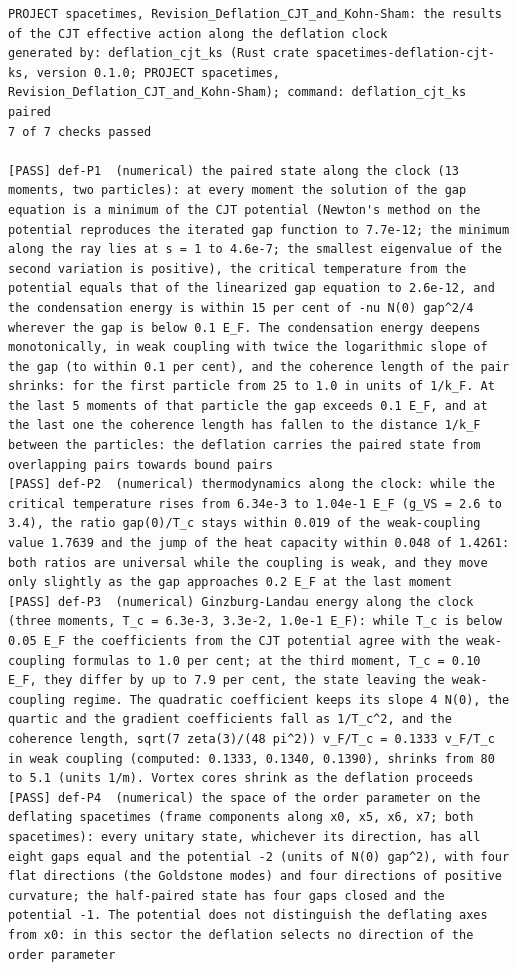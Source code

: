 \documentclass[
  10pt,
]{article}
\begin{document}
\begin{verbatim}
PROJECT spacetimes, Revision_Deflation_CJT_and_Kohn-Sham: the results of the CJT effective action along the deflation clock
generated by: deflation_cjt_ks (Rust crate spacetimes-deflation-cjt-ks, version 0.1.0; PROJECT spacetimes, Revision_Deflation_CJT_and_Kohn-Sham); command: deflation_cjt_ks paired
7 of 7 checks passed

[PASS] def-P1  (numerical) the paired state along the clock (13 moments, two particles): at every moment the solution of the gap equation is a minimum of the CJT potential (Newton's method on the potential reproduces the iterated gap function to 7.7e-12; the minimum along the ray lies at s = 1 to 4.6e-7; the smallest eigenvalue of the second variation is positive), the critical temperature from the potential equals that of the linearized gap equation to 2.6e-12, and the condensation energy is within 15 per cent of -nu N(0) gap^2/4 wherever the gap is below 0.1 E_F. The condensation energy deepens monotonically, in weak coupling with twice the logarithmic slope of the gap (to within 0.1 per cent), and the coherence length of the pair shrinks: for the first particle from 25 to 1.0 in units of 1/k_F. At the last 5 moments of that particle the gap exceeds 0.1 E_F, and at the last one the coherence length has fallen to the distance 1/k_F between the particles: the deflation carries the paired state from overlapping pairs towards bound pairs
[PASS] def-P2  (numerical) thermodynamics along the clock: while the critical temperature rises from 6.34e-3 to 1.04e-1 E_F (g_VS = 2.6 to 3.4), the ratio gap(0)/T_c stays within 0.019 of the weak-coupling value 1.7639 and the jump of the heat capacity within 0.048 of 1.4261: both ratios are universal while the coupling is weak, and they move only slightly as the gap approaches 0.2 E_F at the last moment
[PASS] def-P3  (numerical) Ginzburg-Landau energy along the clock (three moments, T_c = 6.3e-3, 3.3e-2, 1.0e-1 E_F): while T_c is below 0.05 E_F the coefficients from the CJT potential agree with the weak-coupling formulas to 1.0 per cent; at the third moment, T_c = 0.10 E_F, they differ by up to 7.9 per cent, the state leaving the weak-coupling regime. The quadratic coefficient keeps its slope 4 N(0), the quartic and the gradient coefficients fall as 1/T_c^2, and the coherence length, sqrt(7 zeta(3)/(48 pi^2)) v_F/T_c = 0.1333 v_F/T_c in weak coupling (computed: 0.1333, 0.1340, 0.1390), shrinks from 80 to 5.1 (units 1/m). Vortex cores shrink as the deflation proceeds
[PASS] def-P4  (numerical) the space of the order parameter on the deflating spacetimes (frame components along x0, x5, x6, x7; both spacetimes): every unitary state, whichever its direction, has all eight gaps equal and the potential -2 (units of N(0) gap^2), with four flat directions (the Goldstone modes) and four directions of positive curvature; the half-paired state has four gaps closed and the potential -1. The potential does not distinguish the deflating axes from x0: in this sector the deflation selects no direction of the order parameter

\end{verbatim}
\end{document}
